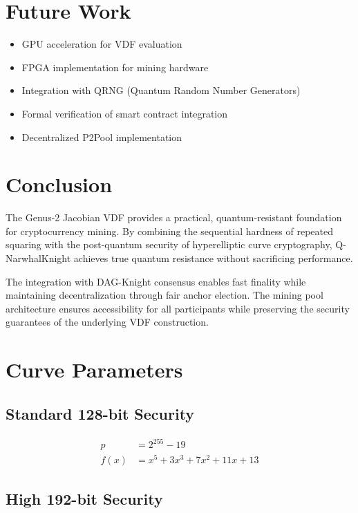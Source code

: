 \documentclass[11pt,a4paper]{article}
\begin{document}
\section{Future Work}

\begin{itemize}
    \item GPU acceleration for VDF evaluation
    \item FPGA implementation for mining hardware
    \item Integration with QRNG (Quantum Random Number Generators)
    \item Formal verification of smart contract integration
    \item Decentralized P2Pool implementation
\end{itemize}

\section{Conclusion}

The Genus-2 Jacobian VDF provides a practical, quantum-resistant foundation for cryptocurrency mining. By combining the sequential hardness of repeated squaring with the post-quantum security of hyperelliptic curve cryptography, Q-NarwhalKnight achieves true quantum resistance without sacrificing performance.

The integration with DAG-Knight consensus enables fast finality while maintaining decentralization through fair anchor election. The mining pool architecture ensures accessibility for all participants while preserving the security guarantees of the underlying VDF construction.

\appendix

\section{Curve Parameters}

\subsection{Standard 128-bit Security}

\begin{align*}
p &= 2^{255} - 19 \\
f(x) &= x^5 + 3x^3 + 7x^2 + 11x + 13
\end{align*}

\subsection{High 192-bit Security}
\end{document}
